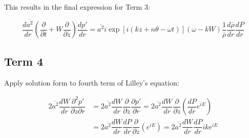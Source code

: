 \documentclass[]{aiaa-tc}%
\begin{document}
This results in the final expression for Term 3:

\begin{equation}
\boxed{\dfrac{d \overline{a^2}}{dr} \left( \dfrac{\partial}{\partial t} + W \dfrac{\partial}{\partial z} \right) \dfrac{dp'}{dr}
= \overline{a^2} i\exp[i(kz + n\theta -\omega t)] (\omega - kW)
    \dfrac{1}{\overline{\rho}}\frac{d \overline{\rho}}{dr} \dfrac{dP}{dr} }
\end{equation}






\subsection{Term 4}

Apply solution form to fourth term of Lilley's equation:


\begin{align*}
2\overline{a^2} \dfrac{dW}{dr}\dfrac{\partial^2 p'}{\partial z \partial r}
  &= 2\overline{a^2} \dfrac{dW}{dr} \dfrac{\partial }{\partial z}
    \dfrac{\partial p'}{\partial r}
    = 2\overline{a^2} \dfrac{dW}{dr} \dfrac{\partial }{\partial z}
    \left( \dfrac{dP}{dr} e^{iE} \right) \\
&= 2\overline{a^2} \dfrac{dW}{dr} \dfrac{dP}{dr}
    \dfrac{\partial }{\partial z} \left( e^{iE} \right)
    = 2\overline{a^2} \dfrac{dW}{dr} \dfrac{dP}{dr} ike^{iE}      \\
\end{align*}
\end{document}
